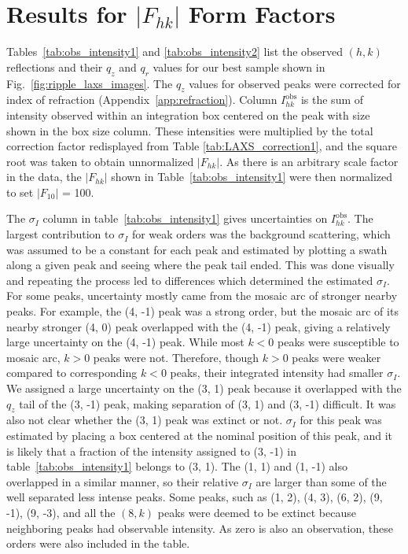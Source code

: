 \newpage
\section{Results for $|F_{hk}|$ Form Factors}\label{sec:LAXS_form_factors}
Tables~\ref{tab:obs_intensity1} and 
\ref{tab:obs_intensity2} list the observed 
$(h,k)$ reflections and their $q_z$ and $q_r$ values for our best sample shown 
in Fig.~\ref{fig:ripple_laxs_images}. The $q_z$ values 
for observed peaks were corrected for index of refraction (Appendix~\ref{app:refraction}).
Column $I^\text{obs}_{hk}$ is the sum of intensity observed within an
integration box centered on the peak with size shown in the box size column.  
These intensities were multiplied by the total correction factor redisplayed 
from Table \ref{tab:LAXS_correction1},
and the square root was taken to obtain 
unnormalized  $|F_{hk}|$.  
As there is an arbitrary scale factor in the data, the $|F_{hk}|$ shown in 
Table~\ref{tab:obs_intensity1} were then normalized to set $|F_{10}|$ = 100.

The $\sigma_I$ column in table~\ref{tab:obs_intensity1} gives uncertainties on 
$I^\text{obs}_{hk}$.
The largest contribution to $\sigma_I$ for weak orders was the background 
scattering, which
was assumed to be a constant for each peak and 
estimated by plotting a swath along a given peak 
and seeing where the peak tail ended. This was done visually and repeating 
the process led to differences which determined the estimated $\sigma_I$.  
For some peaks, uncertainty mostly came 
from the mosaic arc of stronger nearby peaks. For example, the (4, -1) peak was a
strong order, but the mosaic arc of its nearby stronger (4, 0) peak  
overlapped with the (4, -1) peak, giving a relatively large uncertainty
on the (4, -1) peak. While most $k<0$ peaks were susceptible to
mosaic arc, $k > 0$ peaks were not. Therefore, though $k> 0$ peaks were weaker
compared to corresponding $k < 0$ peaks, their integrated intensity
had smaller $\sigma_I$. We assigned a large uncertainty on the (3, 1) peak because
it overlapped with the $q_z$ tail of the (3, -1) peak, making separation of 
(3, 1) and (3, -1) difficult. It was also not clear whether the (3, 1) peak
was extinct or not. $\sigma_I$ for this peak was estimated by placing a
box centered at the nominal position of this peak, and it is likely that a fraction
of the intensity assigned to (3, -1) in table~\ref{tab:obs_intensity1} belongs to (3, 1).
The (1, 1) and (1, -1) also overlapped in a similar manner, so their
relative $\sigma_I$ are larger than some of the well separated less intense peaks.  
Some peaks, such as (1, 2), (4, 3), (6, 2), (9, -1), (9, -3), and all the 
$(8,k)$ peaks were deemed to be extinct because neighboring peaks had 
observable intensity. As zero is also an observation, these orders were also 
included in the table. 

